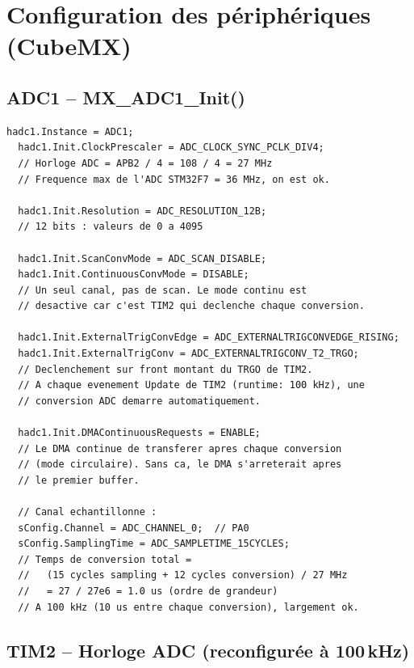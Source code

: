 \documentclass[a4paper,11pt]{article}
\begin{document}
\newpage

\section{Configuration des p\'eriph\'eriques (CubeMX)}

\subsection{ADC1 -- MX\_ADC1\_Init()}

\begin{lstlisting}[style=cstyle,caption={Configuration de l'ADC1}]
  hadc1.Instance = ADC1;
  hadc1.Init.ClockPrescaler = ADC_CLOCK_SYNC_PCLK_DIV4;
  // Horloge ADC = APB2 / 4 = 108 / 4 = 27 MHz
  // Frequence max de l'ADC STM32F7 = 36 MHz, on est ok.

  hadc1.Init.Resolution = ADC_RESOLUTION_12B;
  // 12 bits : valeurs de 0 a 4095

  hadc1.Init.ScanConvMode = ADC_SCAN_DISABLE;
  hadc1.Init.ContinuousConvMode = DISABLE;
  // Un seul canal, pas de scan. Le mode continu est
  // desactive car c'est TIM2 qui declenche chaque conversion.

  hadc1.Init.ExternalTrigConvEdge = ADC_EXTERNALTRIGCONVEDGE_RISING;
  hadc1.Init.ExternalTrigConv = ADC_EXTERNALTRIGCONV_T2_TRGO;
  // Declenchement sur front montant du TRGO de TIM2.
  // A chaque evenement Update de TIM2 (runtime: 100 kHz), une
  // conversion ADC demarre automatiquement.

  hadc1.Init.DMAContinuousRequests = ENABLE;
  // Le DMA continue de transferer apres chaque conversion
  // (mode circulaire). Sans ca, le DMA s'arreterait apres
  // le premier buffer.

  // Canal echantillonne :
  sConfig.Channel = ADC_CHANNEL_0;  // PA0
  sConfig.SamplingTime = ADC_SAMPLETIME_15CYCLES;
  // Temps de conversion total =
  //   (15 cycles sampling + 12 cycles conversion) / 27 MHz
  //   = 27 / 27e6 = 1.0 us (ordre de grandeur)
  // A 100 kHz (10 us entre chaque conversion), largement ok.
\end{lstlisting}

\subsection{TIM2 -- Horloge ADC (reconfigur\'ee \`a 100\,kHz)}
\end{document}
